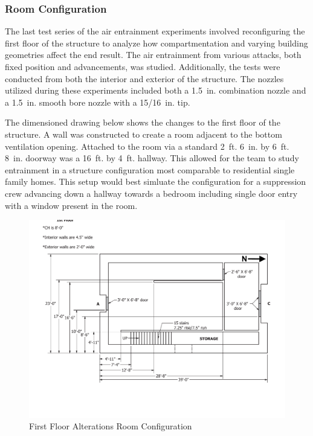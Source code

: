 \documentclass[12pt,oneside]{book}
\begin{document}
\subsubsection{Room Configuration}

The last test series of the air entrainment experiments involved reconfiguring the first floor of the structure to analyze how compartmentation and varying building geometries affect the end result. The air entrainment from various attacks, both fixed position and advancements, was studied. Additionally, the tests were conducted from both the interior and exterior of the structure. The nozzles utilized during these experiments included both a 1.5~in. combination nozzle and a 1.5~in. smooth bore nozzle with a 15/16~in. tip.

The dimensioned drawing below shows the changes to the first floor of the structure. A wall was constructed to create a room adjacent to the bottom ventilation opening. Attached to the room via a standard 2~ft. 6~in. by 6~ft. 8~in. doorway was a 16~ft. by 4~ft. hallway. This allowed for the team to study entrainment in a structure configuration most comparable to residential single family homes. This setup would best simluate the configuration for a suppression crew advancing down a hallway towards a bedroom including single door entry with a window present in the room. 

\begin{figure}[!ht]
	\centering
	\includegraphics[width=6in]{Figures/Air_Entrainment/West_Test_Structure_1st_Floor_nodim.pdf}
	\caption{First Floor Alterations Room Configuration}
	\label{fig:First_Floor_Alterations_Room_Configuration}
\end{figure}
\end{document}

